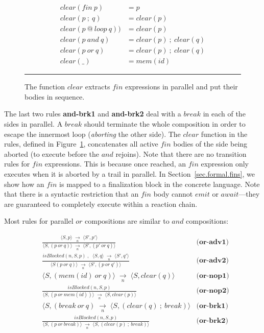 \documentclass{sigplanconf}
\newcommand{\ST}{\1\xrightarrow[~n~]{}\1}
\newcommand{\LL}{\langle}
\newcommand{\RR}{\rangle}
\newcommand{\DS}{\displaystyle}
\newcommand{\1}{\;}
\newcommand{\2}{\;\;}
\newcommand{\3}{\;\;\;}
\newcommand{\5}{\;\;\;\;\;}
\begin{document}
\begin{figure}[t]
{\small
\begin{align*}
  clear( fin~p )       &= p                   \\
  clear( p~;~q )       &= clear(p)            \\
  clear( p~@~loop~q) ) &= clear(p)            \\
  clear( p~and~q )     &= clear(p)~;~clear(q) \\
  clear( p~or~q )      &= clear(p)~;~clear(q) \\
  clear( \_ )          &= mem(id)
\end{align*}
}%
\rule{14cm}{0.37pt}
\caption{
The function $clear$ extracts $fin$ expressions in parallel and put their 
bodies in sequence.
\label{fig.formal.clear}
}
\end{figure}

The last two rules \textbf{and-brk1} and \textbf{and-brk2} deal with a $break$ 
in each of the sides in parallel.
A $break$ should terminate the whole composition in order to escape the 
innermost loop (\emph{aborting} the other side).
%
The $clear$ function in the rules, defined in Figure~\ref{fig.formal.clear}, 
concatenates all active $fin$ bodies of the side being aborted (to execute 
before the $and$ rejoins).
Note that there are no transition rules for $fin$ expressions.
This is because once reached, an $fin$ expression only executes when it is 
aborted by a trail in parallel.
In Section~\ref{sec.formal.fins}, we show how an $fin$ is mapped to a 
finalization block in the concrete language.
%
Note that there is a syntactic restriction that an $fin$ body cannot $emit$ or 
$await$---they are guaranteed to completely execute within a reaction chain.

Most rules for parallel $or$ compositions are similar to $and$ compositions:

{ \setlength{\jot}{20pt}
\begin{eqnarray*}
& \frac
    {\DS \LL S,p \RR \ST \LL S',p' \RR }
    {\DS \LL S, (p~or~q) \RR \ST \LL S', (p'~or~q) \RR }
    & \textbf{(or-adv1)}   \\
& \frac
    {\DS isBlocked(n,S,p) \1,\2 \LL S,q \RR \ST \LL S',q' \RR }
    {\DS \LL S (p~or~q) \RR \ST \LL S', (p~or~q') \RR }
    & \textbf{(or-adv2)}   \\
& \LL S, (mem(id)~or~q) \RR \ST \LL S, clear(q) \RR
    & \textbf{(or-nop1)}   \\
& \frac
    {\DS isBlocked(n,S,p) }
    {\DS \LL S, (p~or~mem(id)) \RR \ST \LL S, clear(p) \RR }
    & \textbf{(or-nop2)}   \\
& \LL S, (break~or~q) \ST \LL S, (clear(q)~;~break) \RR
    & \textbf{(or-brk1)}   \\
& \frac
    {\DS isBlocked(n,S,p) }
    {\DS \LL S, (p~or~break) \RR \ST \LL S, (clear(p)~;~break) \RR }
    & \textbf{(or-brk2)}   %
\end{eqnarray*}
}
\end{document}
